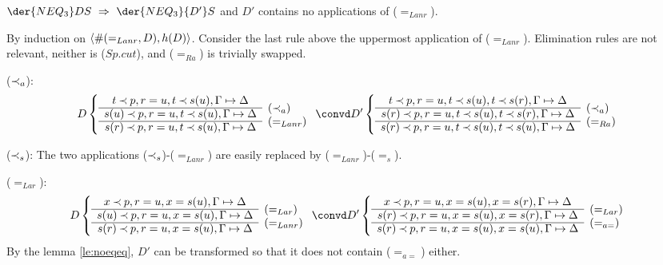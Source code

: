 \begin{LEMMA}\label{le:noLanr}
 $\der{NEQ_3}DS\ \impl\ \der{NEQ_3}{D'}S$ and $D'$ contains no
applications of ($=_{Lanr}$).
\end{LEMMA}
\begin{PROOF}
By induction on $\langle\#(=_{Lanr},D),h(D)\rangle$. Consider the last rule above the
uppermost application of ($=_{Lanr}$). Elimination rules are not relevant,
neither is ($Sp.cut$), and ($=_{Ra}$) is trivially swapped.
\begin{LS}
\item ($\mathbin{\prec}_a$): 
\[ D \left \{ \begin{array}{cl}
t\Incl p, r=u, t\Incl s(u), \Gamma \Seq\Delta \\ \cline{1-1}
s(u)\Incl p, r=u, t\Incl s(u), \Gamma \Seq\Delta  &
\raisebox{1.2ex}[1.5ex][0ex]{($\Incl_a$)} \\ \cline{1-1}
s(r)\Incl p, r=u, t\Incl s(u), \Gamma \Seq\Delta  &
\raisebox{1.2ex}[1.5ex][0ex]{($=_{Lanr}$)} \end{array} \right . \convd
 D' \left \{ \begin{array}{cl}
t\Incl p, r=u, t\Incl s(u), t\Incl s(r), \Gamma \Seq\Delta \\ \cline{1-1}
s(r)\Incl p, r=u, t\Incl s(u), t\Incl s(r),\Gamma \Seq\Delta  &
\raisebox{1.2ex}[1.5ex][0ex]{($\Incl_a$)} \\ \cline{1-1}
s(r)\Incl p, r=u, t\Incl s(u), t\Incl s(u),\Gamma \Seq\Delta  &
\raisebox{1.2ex}[1.5ex][0ex]{($=_{Ra}$)} \end{array} \right . \]
%
\item ($\mathbin{\prec}_s$): The two applications ($\mathbin{\prec}_s$)-($=_{Lanr}$) are easily
replaced by ($=_{Lanr}$)-($=_s$).
\item ($=_{Lar}$): 
\[ D \left \{ \begin{array}{cl}
x\Incl p, r=u, x= s(u), \Gamma \Seq\Delta \\ \cline{1-1}
s(u)\Incl p, r=u, x= s(u), \Gamma \Seq\Delta  &
\raisebox{1.2ex}[1.5ex][0ex]{($=_{Lar}$)} \\ \cline{1-1}
s(r)\Incl p, r=u, x= s(u), \Gamma \Seq\Delta  &
\raisebox{1.2ex}[1.5ex][0ex]{($=_{Lanr}$)} \end{array} \right . \convd
 D' \left \{ \begin{array}{cl}
x\Incl p, r=u, x= s(u), x=s(r),\Gamma \Seq\Delta \\ \cline{1-1}
s(r)\Incl p, r=u, x= s(u), x=s(r),\Gamma \Seq\Delta  &
\raisebox{1.2ex}[1.5ex][0ex]{($=_{Lar}$)} \\ \cline{1-1}
s(r)\Incl p, r=u, x= s(u), x=s(u),\Gamma \Seq\Delta  &
\raisebox{1.2ex}[1.5ex][0ex]{($=_{a=}$)} \end{array} \right . \]
By the lemma \ref{le:noeqeq}, $D'$ can be transformed so that it
does not contain ($=_{a=}$) either.
\end{LS}
\end{PROOF}

